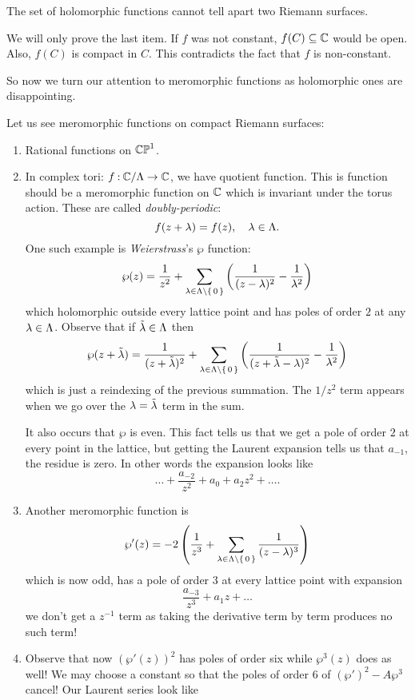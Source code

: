 \documentclass[12pt]{memoir}
\begin{document}
The set of holomorphic functions cannot tell apart two Riemann surfaces.

\begin{ptcbp}
    We will only prove the last item. If $f$ was not constant, $f(C)\subseteq\mathbb{C}$ would be open. Also, $f(C)$ is compact in $C$. This contradicts the fact that $f$ is non-constant.
\end{ptcbp}

So now we turn our attention to meromorphic functions as holomorphic ones are disappointing. 

\begin{Ex}
    Let us see meromorphic functions on compact Riemann surfaces:
    \begin{enumerate}
        \item Rational functions on $\mathbb{CP}^1$.
        \item In complex tori: $f\mathbin{:}\mathbb{C}/\Lambda\to\mathbb{C}$, we have quotient function. This is function should be a meromorphic function on $\mathbb{C}$ which is invariant under the torus action. These are called \emph{doubly-periodic}:
        $$f(z+\lambda)=f(z),\quad\lambda\in\Lambda.$$
        One such example is \emph{Weierstrass}'s $\wp$ function:
        $$\wp(z)=\frac{1}{z^2}+\sum_{\lambda\in\Lambda\setminus\{\,0\,\}}\left(\frac{1}{(z-\lambda)^2}-\frac{1}{\lambda^2}\right)$$
        which holomorphic outside every lattice point and has poles of order $2$ at any $\lambda\in\Lambda$. Observe that if $\tilde{\lambda}\in\Lambda$ then 
        $$\wp(z+\tilde{\lambda})=\frac{1}{(z+\tilde{\lambda})^2}+\sum_{\lambda\in\Lambda\setminus\{\,0\,\}}\left(\frac{1}{(z+\tilde{\lambda}-\lambda)^2}-\frac{1}{\lambda^2}\right)$$
        which is just a reindexing of the previous summation. The $1/z^2$ term appears when we go over the $\lambda=\tilde{\lambda}$ term in the sum.\par
        It also occurs that $\wp$ is even. This fact tells us that we get a pole of order $2$ at every point in the lattice, but getting the Laurent expansion tells us that $a_{-1}$, the residue is zero. In other words the expansion looks like
        $$\dots+\frac{a_{-2}}{z^2}+a_0+a_2z^2+\dots.$$
        \item Another meromorphic function is 
        $$\wp'(z)=-2\left(\frac{1}{z^3}+\sum_{\lambda\in\Lambda\setminus\{\,0\,\}}\frac{1}{(z-\lambda)^3}\right)$$
        which is now odd, has a pole of order $3$ at every lattice point with expansion 
        $$\frac{a_{-3}}{z^3}+a_1z+\dots$$
        we don't get a $z^{-1}$ term as taking the derivative term by term produces no such term!
        \item Observe that now $(\wp'(z))^2$ has poles of order six while $\wp^3(z)$ does as well! We may choose a constant so that the poles of order $6$ of $(\wp')^2-A\wp^3$ cancel! Our Laurent series look like 

\end{enumerate}
\end{Ex}
\end{document}
